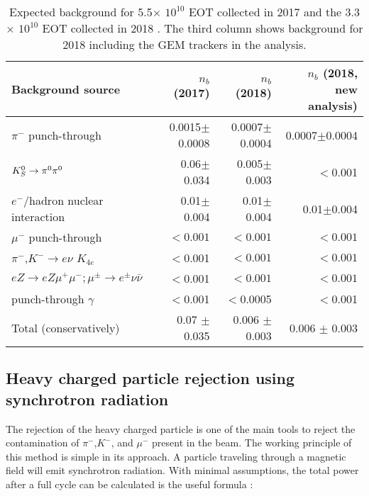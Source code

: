 \begin{table}[bth!]
  \centering
  \caption[Visible mode background]{Expected background for 5.5$\times$ $10^{10}$ EOT collected in 2017 \cite{Banerjee:2018vgk} and the 3.3$\times$ $10^{10}$ EOT collected in 2018 \cite{Banerjee:2019hmi}. The third column shows background for 2018 including the GEM trackers in the analysis.}
  \begin{tabular}{lrrr}
    \hline \hline
    Background source                           & $n_b$ (2017)      &  $n_b$ (2018)   & $n_b$ (2018, new analysis)\\
    \hline
    $\pi^-$ punch-through                        & 0.0015$\pm$0.0008 &  0.0007$\pm$0.0004   & 0.0007$\pm$0.0004   \\    
    $K^0_S \rightarrow \pi^0 \pi^0$                     & 0.06$\pm$0.034    & 0.005$\pm$0.003 &     $<$0.001\\
    $e^-$/hadron nuclear interaction  & 0.01$\pm$0.004    & 0.01$\pm$0.004  & 0.01$\pm$0.004\\    
    $\mu^-$ punch-through                        & $<0.001$ & $<0.001$ & $<0.001$       \\            
    $\pi^-$,$K^- \rightarrow e\nu$ $K_{4e}$              & $<$0.001 & $<0.001$ & $<0.001$\\
    $eZ \rightarrow e Z \mu^+\mu^-;\mu^{\pm}\rightarrow e^{\pm}\nu\bar{\nu}$ & $<$0.001 & $<0.001$ & $<0.001$\\
    punch-through $\gamma$ & $<$0.001 & $<$0.0005 & $<$0.001 \\
    \hline
    Total (conservatively)                      & 0.07 $\pm$ 0.035   & 0.006 $\pm$ 0.003  & 0.006 $\pm$ 0.003\\
    \hline \hline                       
  \end{tabular}
  \label{tab:vis-bkg}
\end{table}



\subsection{Heavy charged particle rejection using synchrotron radiation}
\label{ch3:sec:bkg-srd}

The rejection of the heavy charged particle is one of the main tools to reject the contamination of $\pi^-$,$K^-$, and $\mu^-$ present in the beam. The working principle of this method is simple in its approach. A particle traveling through a magnetic field will emit synchrotron radiation. With minimal assumptions, the total power after a full cycle can be calculated is the useful formula :

